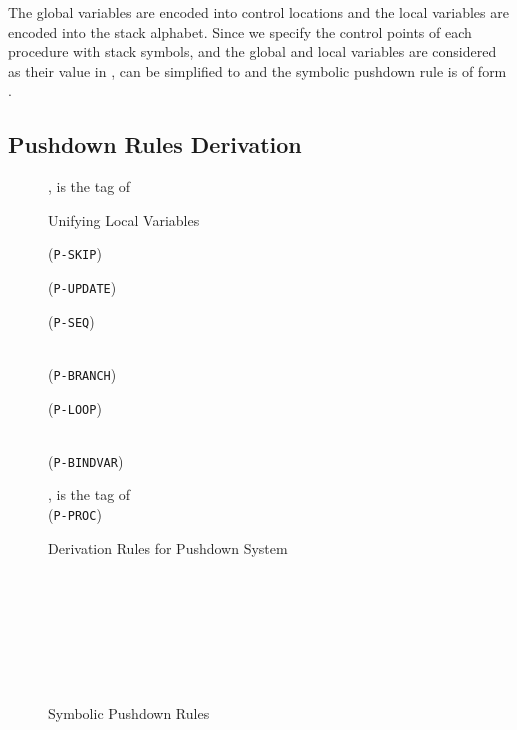 \documentclass{llncs}
\begin{document}
The global variables are encoded into control locations and the
local variables are encoded into the stack alphabet. Since we
specify the control points of each procedure with stack symbols, and
the global and local variables are considered as their value in ,
 can be simplified to  and the symbolic pushdown
rule is of form .

\subsection{\label{subsec:derivation}Pushdown Rules Derivation}

\begin{figure}[b]
\begin{minipage}[t]{4.8in}\footnotesize
\qquad


\hspace*{\fill}


\hspace*{\fill} 

,\hspace*{\fill}  is the tag of

\end{minipage}
\caption{\label{fig:unification}Unifying Local Variables}
\end{figure}
\begin{figure*}[t]\footnotesize
\begin{minipage}[t]{4.8in}
\hfill(\texttt{P-SKIP})

\hspace*{\fill}(\texttt{P-UPDATE})\\
\hspace*{\fill}\hspace*{\fill}

\hfill(\texttt{P-SEQ})

\\
\hspace*{\fill}(\texttt{P-BRANCH})

\quad (\texttt{P-LOOP})

\\
\hspace*{\fill}(\texttt{P-BINDVAR})

,  is the tag of \\
\hspace*{\fill}(\texttt{P-PROC})
\end{minipage}\caption{\label{fig:derivation}Derivation Rules for Pushdown System}
\end{figure*}
\begin{figure}[t]\footnotesize
\begin{minipage}[t]{4.8in}
 \\
\\
\\
\\
\\
\\
 
\end{minipage}
\caption{\label{fig:example1}Symbolic Pushdown Rules}
\end{figure}
\end{document}

